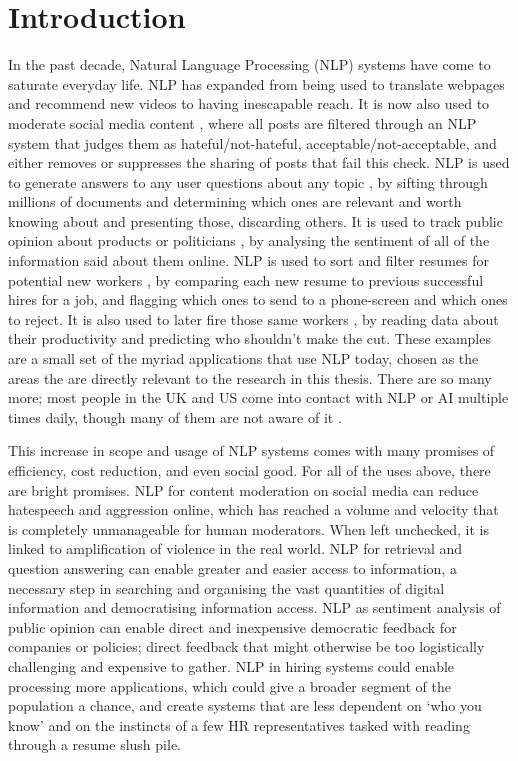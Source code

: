 \chapter{Introduction} 
\label{chapter:introduction}
In the past decade, Natural Language Processing (NLP) systems have come to saturate everyday life. NLP has expanded from being used to translate webpages and recommend new videos to having inescapable reach. It is now also used to moderate social media content \citep{ofcom_content_mod}, where all posts are filtered through an NLP system that judges them as hateful/not-hateful, acceptable/not-acceptable, and either removes or suppresses the sharing of posts that fail this check. NLP is used to generate answers to any user questions about any topic \citep{rajpurkar-etal-2016-squad, rajpurkar-etal-2018-know}, by sifting through millions of documents and determining which ones are relevant and worth knowing about and presenting those, discarding others. It is used to  track public opinion about products or politicians \citep{peoples-2020-modeling}, by analysing the sentiment of all of the information said about them online. NLP is used to sort and filter resumes for potential new workers \citep{parasurama-sedoc-2022-gendered}, by comparing each new resume to previous successful hires for a job, and flagging which ones to send to a phone-screen and which ones to reject. It is also used to later fire those same workers \citep{forbes_hiring}, by reading data about their productivity and predicting who shouldn't make the cut. These examples are a small set of the myriad applications that use NLP today, chosen as the areas the are directly relevant to the research in this thesis. There are so many more; most people in the UK and US come into contact with NLP or AI multiple times daily, though many of them are not aware of it \citep{kennedy2023public}.

This increase in scope and usage of NLP systems comes with many promises of efficiency, cost reduction, and even social good. For all of the uses above, there are bright promises. NLP for content moderation on social media can reduce hatespeech and aggression online, which has reached a volume and velocity that is completely unmanageable for human moderators. When left unchecked, it is linked to amplification of violence in the real world. NLP for retrieval and question answering can enable greater and easier access to information, a necessary step in searching and organising the vast quantities of digital information and democratising information access. NLP as sentiment analysis of public opinion can enable direct and inexpensive democratic feedback for companies or policies; direct feedback that might otherwise be too logistically challenging and expensive to gather. NLP in hiring systems could enable processing more applications, which could give a broader segment of the population a chance, and create systems that are less dependent on `who you know' and on the instincts of a few HR representatives tasked with reading through a resume slush pile.

